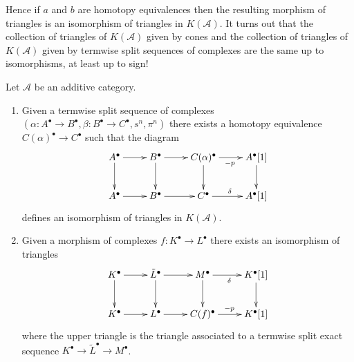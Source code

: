 \noindent
Hence if $a$ and $b$ are homotopy equivalences then
the resulting morphism of triangles is an isomorphism of triangles
in $K(\mathcal{A})$.
It turns out that the collection of triangles of $K(\mathcal{A})$
given by cones and the collection of triangles of $K(\mathcal{A})$
given by termwise split sequences of complexes are the same
up to isomorphisms, at least up to sign!

\begin{lemma}
\label{lemma-the-same-up-to-isomorphisms}
Let $\mathcal{A}$ be an additive category.
\begin{enumerate}
\item Given a termwise split sequence of complexes
$(\alpha : A^\bullet \to B^\bullet,
\beta : B^\bullet \to C^\bullet, s^n, \pi^n)$
there exists a homotopy equivalence $C(\alpha)^\bullet \to C^\bullet$
such that the diagram
$$
\xymatrix{
A^\bullet \ar[r] \ar[d] & B^\bullet \ar[d] \ar[r] &
C(\alpha)^\bullet \ar[r]_{-p} \ar[d] & A^\bullet[1] \ar[d] \\
A^\bullet \ar[r] & B^\bullet \ar[r] &
C^\bullet \ar[r]^\delta & A^\bullet[1]
}
$$
defines an isomorphism of triangles in $K(\mathcal{A})$.
\item Given a morphism of complexes $f : K^\bullet \to L^\bullet$
there exists an isomorphism of triangles
$$
\xymatrix{
K^\bullet \ar[r] \ar[d] & \tilde L^\bullet \ar[d] \ar[r] &
M^\bullet \ar[r]_{\delta} \ar[d] & K^\bullet[1] \ar[d] \\
K^\bullet \ar[r] & L^\bullet \ar[r] &
C(f)^\bullet \ar[r]^{-p} & K^\bullet[1]
}
$$
where the upper triangle is the triangle associated to a
termwise split exact sequence $K^\bullet \to \tilde L^\bullet \to M^\bullet$.
\end{enumerate}
\end{lemma}

